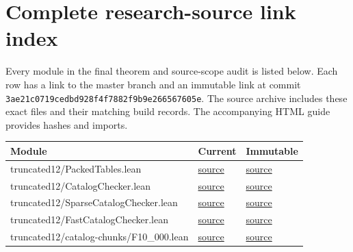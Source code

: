 \clearpage\section{Complete research-source link index}\label{app:links}
Every module in the final theorem and source-scope audit is listed below. Each row has a link to the master branch and an immutable link at commit \nolinkurl{3ae21c0719cedbd928f4f7882f9b9e266567605e}. The source archive includes these exact files and their matching build records. The accompanying HTML guide provides hashes and imports.
\footnotesize\begin{longtable}{@{}P{.62\textwidth}P{.14\textwidth}P{.14\textwidth}@{}}
\toprule Module & Current & Immutable\\\midrule\endhead
truncated12/PackedTables.lean & \href{https://github.com/alectionary/vibe-math/blob/master/formalization/distance-preservation/truncated12/PackedTables.lean}{source} & \href{https://github.com/alectionary/vibe-math/blob/3ae21c0719cedbd928f4f7882f9b9e266567605e/formalization/distance-preservation/truncated12/PackedTables.lean}{source}\\
truncated12/CatalogChecker.lean & \href{https://github.com/alectionary/vibe-math/blob/master/formalization/distance-preservation/truncated12/CatalogChecker.lean}{source} & \href{https://github.com/alectionary/vibe-math/blob/3ae21c0719cedbd928f4f7882f9b9e266567605e/formalization/distance-preservation/truncated12/CatalogChecker.lean}{source}\\
truncated12/SparseCatalogChecker.lean & \href{https://github.com/alectionary/vibe-math/blob/master/formalization/distance-preservation/truncated12/SparseCatalogChecker.lean}{source} & \href{https://github.com/alectionary/vibe-math/blob/3ae21c0719cedbd928f4f7882f9b9e266567605e/formalization/distance-preservation/truncated12/SparseCatalogChecker.lean}{source}\\
truncated12/FastCatalogChecker.lean & \href{https://github.com/alectionary/vibe-math/blob/master/formalization/distance-preservation/truncated12/FastCatalogChecker.lean}{source} & \href{https://github.com/alectionary/vibe-math/blob/3ae21c0719cedbd928f4f7882f9b9e266567605e/formalization/distance-preservation/truncated12/FastCatalogChecker.lean}{source}\\
truncated12/catalog-chunks/F10\_000.lean & \href{https://github.com/alectionary/vibe-math/blob/master/formalization/distance-preservation/truncated12/catalog-chunks/F10_000.lean}{source} & \href{https://github.com/alectionary/vibe-math/blob/3ae21c0719cedbd928f4f7882f9b9e266567605e/formalization/distance-preservation/truncated12/catalog-chunks/F10_000.lean}{source}\\

\end{longtable}
